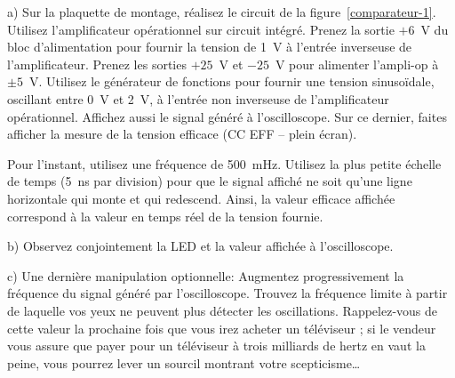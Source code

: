 \documentclass[canadien,12pt,oneside,letterpaper]{article}
\begin{document}
a) Sur la plaquette de montage, réalisez le circuit de la figure~\ref{comparateur-1}. Utilisez l'amplificateur opérationnel sur circuit intégré. Prenez la sortie $+6$~V du bloc d'alimentation pour fournir la tension de 1~V à l'entrée inverseuse de l'amplificateur. Prenez les sorties $+25$~V et $-25$~V pour alimenter l'ampli-op à $\pm5$~V. Utilisez le générateur de fonctions pour fournir une tension sinusoïdale, oscillant entre 0~V et 2~V, à l'entrée non inverseuse de l'amplificateur opérationnel. Affichez aussi le signal généré à l'oscilloscope. Sur ce dernier, faites afficher la mesure de la tension efficace (CC EFF -- plein écran).

Pour l'instant, utilisez une fréquence de 500~mHz. Utilisez la plus petite échelle de temps (5~ns par division) pour que le signal affiché ne soit qu'une ligne horizontale qui monte et qui redescend. Ainsi, la valeur efficace affichée correspond à la valeur en temps réel de la tension fournie.

b) Observez conjointement la LED et la valeur affichée à l'oscilloscope.

c) Une dernière manipulation optionnelle: Augmentez progressivement la fréquence du signal généré par l'oscilloscope. Trouvez la fréquence limite à partir de laquelle vos yeux ne peuvent plus détecter les oscillations. Rappelez-vous de cette valeur la prochaine fois que vous irez acheter un téléviseur ; si le vendeur vous assure que payer pour un téléviseur à trois milliards de hertz en vaut la peine, vous pourrez lever un sourcil montrant votre scepticisme\ldots


\end{document}
